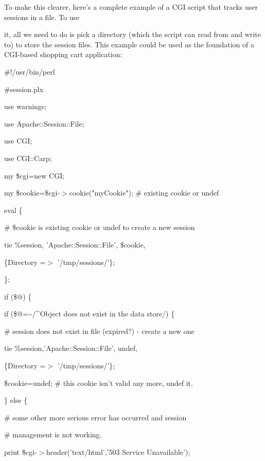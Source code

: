 \documentclass[a4paper,11pt]{book}
\begin{document}
\noindent To make this clearer, here's a complete example of a CGI script that tracks user sessions in a file. To use

\noindent it, all we need to do is pick a directory (which the script can read from and write to) to store the session files. This example could be used as the foundation of a CGI-based shopping cart application:

\noindent 

\noindent \#!/usr/bin/perl

\noindent \#session.plx

\noindent use warnings;

\noindent use Apache::Session::File;

\noindent use CGI;

\noindent use CGI::Carp;

\noindent 

\noindent my \$cgi=new CGI;

\noindent my \$cookie=\$cgi-$>$cookie("myCookie"); \# existing cookie or undef

\noindent 

\noindent eval \{

\noindent \# \$cookie is existing cookie or undef to create a new session

\noindent tie \%session, 'Apache::Session::File', \$cookie,

\noindent \{Directory =$>$ '/tmp/sessions/'\};

\noindent \};

\noindent 

\noindent if (\$@) \{

\noindent if (\$@=\~{}/\^{}Object does not exist in the data store/) \{

\noindent \# session does not exist in file (expired?) - create a new one

\noindent tie \%session,'Apache::Session::File', undef,

\noindent \{Directory =$>$ '/tmp/sessions/'\};

\noindent 

\noindent 

\noindent \$cookie=undef; \# this cookie isn't valid any more, undef it.

\noindent \} else \{

\noindent \# some other more serious error has occurred and session

\noindent \# management is not working.

\noindent print \$cgi-$>$header('text/html','503 Service Unavailable');
\end{document}
